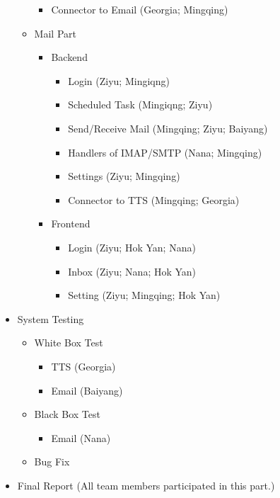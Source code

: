 \documentclass{article}
\begin{document}
\begin{itemize}
\begin{itemize}
\begin{itemize}
            \item Connector to Email (Georgia; Mingqing)
        \end{itemize}
        \item Mail Part
        \begin{itemize}
            \item Backend
            \begin{itemize}
                \item Login (Ziyu; Mingiqng)
                \item Scheduled Task (Mingiqng; Ziyu)
                \item Send/Receive Mail (Mingqing; Ziyu; Baiyang)
                \item Handlers of IMAP/SMTP (Nana; Mingqing)
                \item Settings (Ziyu; Mingqing)
                \item Connector to TTS (Mingqing; Georgia)
            \end{itemize}
            \item Frontend
            \begin{itemize}
                \item Login (Ziyu; Hok Yan; Nana)
                \item Inbox (Ziyu; Nana; Hok Yan)
                \item Setting (Ziyu; Mingqing; Hok Yan)
            \end{itemize}
        \end{itemize}
    \end{itemize}
    \item System Testing
    \begin{itemize}
        \item White Box Test
        \begin{itemize}
            \item TTS (Georgia)
            \item Email (Baiyang)
        \end{itemize}
        \item Black Box Test
        \begin{itemize}
            \item Email (Nana)
        \end{itemize}
        \item Bug Fix
    \end{itemize}
    \item Final Report (All team members participated in this part.)
\end{itemize}
\end{document}

